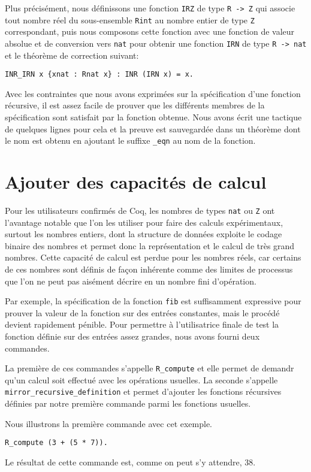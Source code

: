 \documentclass[draft]{jflart}
\begin{document}
Plus précisément, nous définissons une fonction \texttt{IRZ} de type
\texttt{R -> Z} qui associe tout nombre réel du sous-ensemble \texttt{Rint}
au nombre entier de type \texttt{Z} correspondant, puis nous composons
cette fonction avec une fonction de valeur absolue et de conversion
vers \texttt{nat} pour obtenir une fonction \texttt{IRN} de type \texttt{R ->
  nat} et le théorème de correction suivant:
\begin{verbatim}
INR_IRN x {xnat : Rnat x} : INR (IRN x) = x.
\end{verbatim}

Avec les contraintes que nous avons exprimées sur la spécification
d'une fonction récursive, il est assez facile de prouver que les
différents membres de la spécification sont satisfait par la fonction
obtenue.  Nous avons écrit une tactique de quelques lignes pour cela
et la preuve est sauvegardée dans un théorème dont le nom est obtenu
en ajoutant le suffixe \texttt{\_eqn} au nom de la fonction.

\section{Ajouter des capacités de calcul}
Pour les utilisateurs confirmés de Coq, les nombres de types \texttt{nat} ou
\texttt{Z} ont l'avantage notable que l'on les utiliser pour faire des calculs
expérimentaux, surtout les nombres entiers, dont la structure de données
exploite le codage binaire des nombres et permet donc la représentation
et le calcul de très grand nombres.  Cette capacité de calcul est perdue pour
les nombres réels, car certains de ces nombres sont définis de façon inhérente
comme des limites de processus que l'on ne peut pas aisément décrire en
un nombre fini d'opération.

Par exemple, la spécification de la fonction \texttt{fib} est
suffisamment expressive pour prouver la valeur de la fonction sur des
entrées constantes, mais le procédé devient rapidement pénible.  Pour
permettre à l'utilisatrice finale de test la fonction définie sur des
entrées assez grandes, nous avons fourni deux commandes.

La première de ces commandes s'appelle \texttt{R\_compute} et elle
permet de demandr qu'un calcul soit effectué avec les opérations
usuelles.  La seconde s'appelle \texttt{mirror\_recursive\_definition}
et permet d'ajouter les fonctions récursives définies par notre
première commande parmi les fonctions usuelles.

Nous illustrons la première commande avec cet exemple.
\begin{verbatim}
R_compute (3 + (5 * 7)).
\end{verbatim}
Le résultat de cette commande est, comme on peut s'y attendre, 38.
\end{document}

